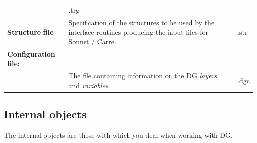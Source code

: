 \documentclass[12pt]{report}
\begin{document}
{\begin{tabular}{|p{113pt}p{200pt}p{59pt}|}
& \parbox{59pt}{\centering 
.trg
} \\
\parbox{113pt}{\centering 
\textbf{Structure file}
} &
Specification of the structures \textendash{} to be used by the
interface routines producing the input files for Sonnet / Carre.
& \parbox{59pt}{\centering 
.str
} \\
\hline
\parbox{113pt}{\raggedright 
\textbf{Configuration file:}
} &
~
& \parbox{59pt}{\raggedright 
~
} \\
\hline
\parbox{113pt}{\raggedright 
~
} &
The file containing information on the DG \textit{layers} and
\textit{variables}.
& \parbox{59pt}{\centering 
.dgc
} \\
\hline
\end{tabular}
\vspace{2pt}

}

\subsection{Internal objects}
\label{internalobjects}

The internal objects are those with which you deal when working with
DG.
\end{document}
